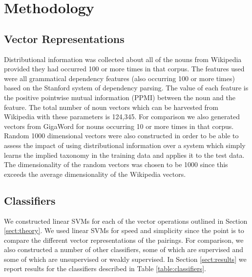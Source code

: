 \documentclass[11pt]{article}
\begin{document}
\section{Methodology}

\subsection{Vector Representations}

Distributional information was collected about all of the nouns from Wikipedia provided they had occurred 100 or more times in that corpus.  The features used were all grammatical dependency features (also occurring 100 or more times) based on the Stanford system of dependency parsing.  The value of each feature is the positive pointwise mutual information (PPMI) between the noun and the feature. The total number of noun vectors which can be harvested from Wikipedia with these parameters is 124,345.   For comparison we also generated vectors from GigaWord for nouns occurring 10 or more times in that corpus.   Random 1000 dimensional vectors were also constructed in order to be able to assess the impact of using distributional information over a system which simply learns the implied taxonomy in the training data and applies it to the test data.  The dimensionality of the random vectors was chosen to be 1000 since this exceeds the average dimensionality of the Wikipedia vectors.

\subsection{Classifiers}

We constructed linear SVMs for each of the vector operations outlined in Section \ref{sect:theory}.  We used linear SVMs for speed and simplicity since the point is to compare the different vector representations of the pairings.  For comparison, we also constructed a number of other classifiers, some of which are supervised and some of which are unsupervised or weakly supervised.  In Section \ref{sect:results} we report results for the classifiers described in Table \ref{table:classifiers}.
\end{document}
